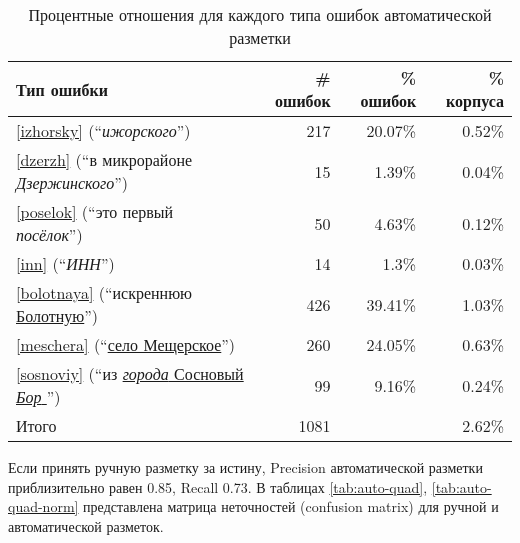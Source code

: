 \documentclass[14pt,russian]{extreport}
\begin{document}
\begin{table}[p]
  \centering
  \begin{tabular}{l|rrr}
    Тип ошибки & \# ошибок & \% ошибок & \% корпуса \\
    \hline
    \ref{izhorsky} (``{\it ижорского}'') & 217 & 20.07\% & 0.52\%  \\
    \ref{dzerzh} (``в микрорайоне {\it Дзержинского}'') & 15 & 1.39\% & 0.04\%  \\
    \ref{poselok} (``это первый {\it посёлок}'') & 50 & 4.63\% & 0.12\%  \\
    \ref{inn} (``{\it ИНН}'') & 14 & 1.3\% & 0.03\%  \\
    \ref{bolotnaya} (``искреннюю \underline{Болотную}'') & 426 & 39.41\% & 1.03\%  \\
    \ref{meschera} (``\underline{село Мещерское}'') & 260 & 24.05\% & 0.63\%  \\
    \ref{sosnoviy} (``из \underline{ {\it города} Сосновый {\it Бор} }'') & 99 & 9.16\% & 0.24\%  \\
    \hline
    Итого & 1081 & & 2.62\%
  \end{tabular}
  \caption{Процентные отношения для каждого типа ошибок автоматической разметки}
  \label{tab:auto-errors}
\end{table}

Если принять ручную разметку за истину, Precision автоматической разметки
приблизительно равен 0.85, Recall 0.73. В таблицах \ref{tab:auto-quad},
\ref{tab:auto-quad-norm} представлена матрица неточностей (confusion matrix)
для ручной и автоматической разметок.

\begin{table}[p]
  \centering
{}
  \caption{Нормированная матрица неточностей для автоматической разметки}
  \label{tab:auto-quad}
\end{table}

\begin{table}[p]
  \centering
{}
  \caption{Матрица неточностей для автоматической разметки}
  \label{tab:auto-quad-norm}
\end{table}
\end{document}
